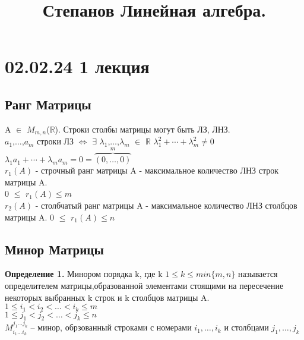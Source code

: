 \documentclass[a4paper,12pt]{article} %
\title{
	Степанов Линейная алгебра.
}
\begin{document}
	\maketitle
	\tableofcontents
	\section{02.02.24 1 лекция}
	\subsection{Ранг Матрицы}
	
	\noindent A $\in$ $M_{m,n}$($\mathbb{R}$).
	Строки столбы матрицы могут быть ЛЗ, ЛНЗ.\\
	
	\noindent $a_1$,$\dotso$,$a_m$ строки ЛЗ $\iff$ $\exists$ $\lambda_1$,$\dotso$,$\lambda_m$ $\in$ $\mathbb{R}$ $ \lambda_1^2 + \dotsb + \lambda_m^2 \neq 0 $ \\
	$\lambda_1 a_1 + \dotsb + \lambda_m a_m = 0 = \overbrace{(0,\dotso,0)}^{m} $\\
	
	\noindent$r_1(A)$ - строчный ранг матрицы A - максимальное количество ЛНЗ строк матрицы A.\\
	0 $\leq$ $r_1(A) \leq m$ \\
	
	\noindent$r_2(A)$ - столбчатый ранг матрицы A - максимальное количество ЛНЗ столбцов матрицы A. 
	0 $\leq$ $r_1(A) \leq n$\\
	\subsection{Минор Матрицы}
	\textbf{Определение 1.} Минором порядка k, где k $1\leq k \leq min\{m,n\}$ называется определителем матрицы,образованной элементами стоящими на пересечение некоторых выбранных k строк и k столбцов матрицы A. \\
	$1 \leq i_1 < i_2 < \dotso < i_k \leq m $\\
	$1 \leq j_1 < j_2 < \dotso < j_k \leq n $\\
	
	$M_{i_1 \dotso i_k}^{j_1 \dotso j_k}$ -- минор, обрзованный строками с номерами $i_1, \dotso, i_k$ и столбцами $j_1,\dotso, j_k$\\
	
\end{document}
